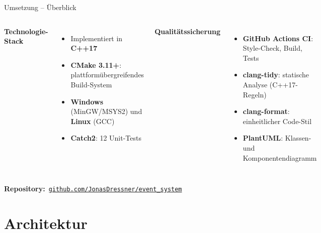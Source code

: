 \documentclass{beamer}
\begin{document}
\begin{frame}{Umsetzung -- Überblick}
\begin{columns}[T]
    \textbf{Technologie-Stack}
    \begin{itemize}
        \item Implementiert in \textbf{C++17}
        \item \textbf{CMake 3.11+}: plattformübergreifendes Build-System
        \item \textbf{Windows} (MinGW/MSYS2) und \textbf{Linux} (GCC)
        \item \textbf{Catch2}: 12 Unit-Tests
    \end{itemize}

    \textbf{Qualitätssicherung}
    \begin{itemize}
        \item \textbf{GitHub Actions CI}: Style-Check, Build, Tests
        \item \textbf{clang-tidy}: statische Analyse (C++17-Regeln)
        \item \textbf{clang-format}: einheitlicher Code-Stil
        \item \textbf{PlantUML}: Klassen- und Komponentendiagramm
    \end{itemize}

\end{columns}

\vspace{1.2em}
\small\textbf{Repository:}~\href{https://github.com/JonasDressner/event_system}{\texttt{github.com/JonasDressner/event\_system}}
\end{frame}

\section{Architektur}
\end{document}
